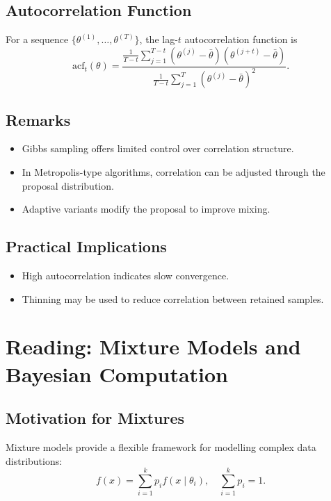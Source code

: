 \documentclass[12pt,oneside]{book}
\numberwithin{equation}{section}
\theoremstyle{definition}
\theoremstyle{plain}
\theoremstyle{remark}
\begin{document}
\subsection*{Autocorrelation Function}

For a sequence $\{\theta^{(1)}, \ldots, \theta^{(T)}\}$, the lag-$t$ autocorrelation function is
\[
\mathrm{acf}_t(\theta)
=
\frac{
\frac{1}{T-t} \sum_{j=1}^{T-t} (\theta^{(j)} - \bar{\theta})(\theta^{(j+t)} - \bar{\theta})
}{
\frac{1}{T-t} \sum_{j=1}^{T} (\theta^{(j)} - \bar{\theta})^2
}.
\]

\subsection*{Remarks}

\begin{itemize}
\item Gibbs sampling offers limited control over correlation structure.
\item In Metropolis-type algorithms, correlation can be adjusted through the proposal distribution.
\item Adaptive variants modify the proposal to improve mixing.
\end{itemize}

\subsection*{Practical Implications}

\begin{itemize}
\item High autocorrelation indicates slow convergence.
\item Thinning may be used to reduce correlation between retained samples.
\end{itemize}

\section{Reading: Mixture Models and Bayesian Computation}

\subsection*{Motivation for Mixtures}

Mixture models provide a flexible framework for modelling complex data distributions:
\[
f(x) = \sum_{i=1}^k p_i f(x \mid \theta_i), \quad \sum_{i=1}^k p_i = 1.
\]
\end{document}
